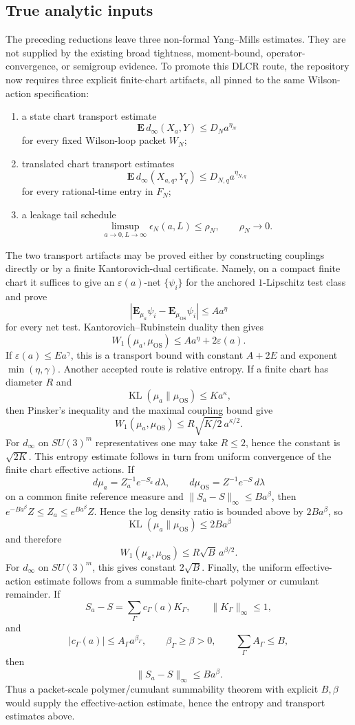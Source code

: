 \subsection{True analytic inputs}
The preceding reductions leave three non-formal Yang--Mills estimates. They are
not supplied by the existing broad tightness, moment-bound, operator-convergence,
or semigroup evidence. To promote this DLCR route, the repository now requires
three explicit finite-chart artifacts, all pinned to the same Wilson-action
specification:
\begin{enumerate}
\item a state chart transport estimate
\[
  \mathbf E\,d_\infty(X_a,Y)\leq D_Na^{\eta_N}
\]
for every fixed Wilson-loop packet $W_N$;
\item translated chart transport estimates
\[
  \mathbf E\,d_\infty(X_{a,q},Y_q)\leq D_{N,q}a^{\eta_{N,q}}
\]
for every rational-time entry in $F_N$;
\item a leakage tail schedule
\[
  \limsup_{a\to0,L\to\infty}\epsilon_N(a,L)\leq\rho_N,\qquad \rho_N\to0.
\]
\end{enumerate}
The two transport artifacts may be proved either by constructing couplings
directly or by a finite Kantorovich-dual certificate. Namely, on a compact
finite chart it suffices to give an $\varepsilon(a)$-net
$\{\psi_i\}$ for the anchored $1$-Lipschitz test class and prove
\[
  \left|\mathbf E_{\mu_a}\psi_i-\mathbf E_{\mu_{\mathrm{OS}}}\psi_i\right|
  \leq A a^\eta
\]
for every net test. Kantorovich--Rubinstein duality then gives
\[
  W_1(\mu_a,\mu_{\mathrm{OS}})
  \leq A a^\eta+2\varepsilon(a).
\]
If $\varepsilon(a)\leq Ea^\gamma$, this is a transport bound with constant
$A+2E$ and exponent $\min(\eta,\gamma)$.
Another accepted route is relative entropy. If a finite chart has diameter
$R$ and
\[
  \operatorname{KL}(\mu_a\|\mu_{\mathrm{OS}})\leq K a^\kappa,
\]
then Pinsker's inequality and the maximal coupling bound give
\[
  W_1(\mu_a,\mu_{\mathrm{OS}})
  \leq R\sqrt{K/2}\,a^{\kappa/2}.
\]
For $d_\infty$ on $SU(3)^m$ representatives one may take $R\leq2$, hence the
constant is $\sqrt{2K}$.
This entropy estimate follows in turn from uniform convergence of the finite
chart effective actions. If
\[
  d\mu_a=Z_a^{-1}e^{-S_a}\,d\lambda,\qquad
  d\mu_{\mathrm{OS}}=Z^{-1}e^{-S}\,d\lambda
\]
on a common finite reference measure and
$\|S_a-S\|_\infty\leq B a^\beta$, then
$e^{-Ba^\beta}Z\leq Z_a\leq e^{Ba^\beta}Z$. Hence the log density ratio is
bounded above by $2Ba^\beta$, so
\[
  \operatorname{KL}(\mu_a\|\mu_{\mathrm{OS}})\leq 2Ba^\beta
\]
and therefore
\[
  W_1(\mu_a,\mu_{\mathrm{OS}})
  \leq R\sqrt{B}\,a^{\beta/2}.
\]
For $d_\infty$ on $SU(3)^m$, this gives constant $2\sqrt B$.
Finally, the uniform effective-action estimate follows from a summable
finite-chart polymer or cumulant remainder. If
\[
  S_a-S=\sum_\Gamma c_\Gamma(a)K_\Gamma,\qquad
  \|K_\Gamma\|_\infty\leq1,
\]
and
\[
  |c_\Gamma(a)|\leq A_\Gamma a^{\beta_\Gamma},\qquad
  \beta_\Gamma\geq\beta>0,\qquad
  \sum_\Gamma A_\Gamma\leq B,
\]
then
\[
  \|S_a-S\|_\infty\leq Ba^\beta.
\]
Thus a packet-scale polymer/cumulant summability theorem with explicit
$B,\beta$ would supply the effective-action estimate, hence the entropy and
transport estimates above.

